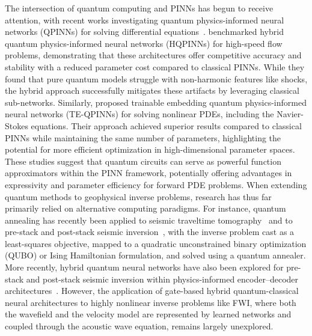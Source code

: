\documentclass[11pt,a4paper]{article}
\begin{document}
The intersection of quantum computing and PINNs has begun to receive attention, with recent works investigating quantum physics-informed neural networks (QPINNs) for solving differential equations~\citep{https://doi.org/10.1002/qute.202300065}. \citet{LEONG2025106782} benchmarked hybrid quantum physics-informed neural networks (HQPINNs) for high-speed flow problems, demonstrating that these architectures offer competitive accuracy and stability with a reduced parameter cost compared to classical PINNs. While they found that pure quantum models struggle with non-harmonic features like shocks, the hybrid approach successfully mitigates these artifacts by leveraging classical sub-networks. Similarly, \citet{Berger2025} proposed trainable embedding quantum physics-informed neural networks (TE-QPINNs) for solving nonlinear PDEs, including the Navier-Stokes equations. Their approach achieved superior results compared to classical PINNs while maintaining the same number of parameters, highlighting the potential for more efficient optimization in high-dimensional parameter spaces. These studies suggest that quantum circuits can serve as powerful function approximators within the PINN framework, potentially offering advantages in expressivity and parameter efficiency for forward PDE problems. When extending quantum methods to geophysical inverse problems, research has thus far primarily relied on alternative computing paradigms. For instance, quantum annealing has recently been applied to seismic traveltime tomography~\citep{Nguyen2025} and to pre-stack and post-stack seismic inversion~\citep{Vashisth2025GEO}, with the inverse problem cast as a least-squares objective, mapped to a quadratic unconstrained binary optimization (QUBO) or Ising Hamiltonian formulation, and solved using a quantum annealer. More recently, hybrid quantum neural networks have also been explored for pre-stack and post-stack seismic inversion within physics-informed encoder--decoder architectures~\citep{Vashisth2025HQNN}. However, the application of gate-based hybrid quantum-classical neural architectures to highly nonlinear inverse problems like FWI, where both the wavefield and the velocity model are represented by learned networks and coupled through the acoustic wave equation, remains largely unexplored.
\end{document}
